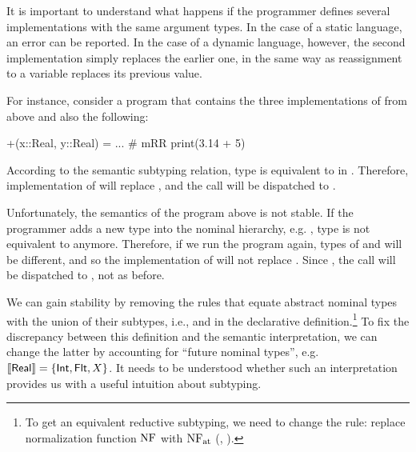 It is important to understand what happens if the programmer defines
several implementations with the same argument types. 
In the case of a static language, an error can be reported.
In the case of a dynamic language, however, the second implementation
simply replaces the earlier one, in the same way as reassignment
to a variable replaces its previous value.

For instance, consider a program 
that contains the three implementations of \jlcode{(+)} from above
and also the following:
\begin{lstminijl}
+(x::Real, y::Real) = ...   # mRR
print(3.14 + 5)	 
\end{lstminijl}
According to the semantic subtyping relation, type  is equivalent
to  in \BetaJulia. 
Therefore, implementation of  will replace , 
and the call  will be dispatched to .

Unfortunately, the semantics of the program above is not stable.
If the programmer adds a new type into the nominal hierarchy,
e.g. , type  is not
equivalent to  anymore.
Therefore, if we run the program again, types of  and 
will be different, and so the implementation of  
will not replace . 
Since , the call  
will be dispatched to , not  as before.

We can gain stability by removing the rules that 
equate abstract nominal types with the union of their subtypes,
i.e.,  and  in the declarative definition.\footnote{
    To get an equivalent reductive subtyping, we need to change 
    the  rule: replace normalization function $\mathop{\mathrm{NF}}$ with $\mathop{\mathrm{NF}_{\mathrm{at}}}$ 
    (, ).}
To fix the discrepancy between this definition and the semantic interpretation,
we can change the latter by accounting for ``future nominal types'',
e.g. $\llbracket \mathsf{Real} \rrbracket = \{\mathsf{Int}, \mathsf{Flt}, X\}$.
It needs to be understood whether such an interpretation provides us with
a useful intuition about subtyping.


